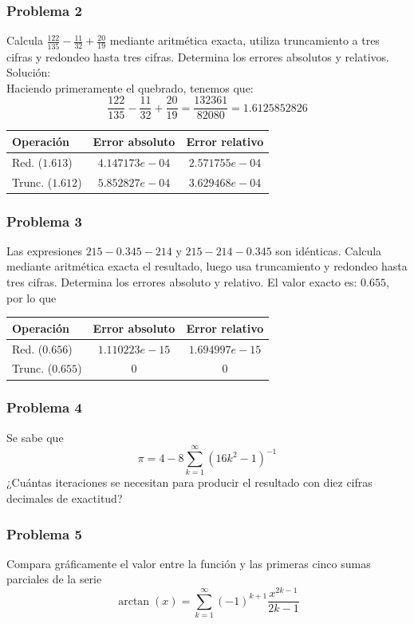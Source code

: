 \begin{frame}
\frametitle{Problema 2}
Calcula $\frac{122}{135} - \frac{11}{32} + \frac{20}{19}$ mediante aritmética exacta, utiliza truncamiento a tres cifras y redondeo hasta tres cifras. Determina los errores absolutos y relativos.
\pause
\\
\medskip
Solución:
\\
\medskip
Haciendo primeramente el quebrado, tenemos que:
\[ \dfrac{122}{135} - \dfrac{11}{32} + \dfrac{20}{19} = \dfrac{132361}{82080} = 1.6125852826 \]
\begin{tabular}{l | c | c}
\hline
Operación & Error absoluto & Error relativo \\ \hline
Red. ($1.613$) & $4.147173e-04$ & $2.571755e-04$ \\ \hline
Trunc. ($1.612$) & $5.852827e-04$ & $3.629468e-04$ \\ \hline
\end{tabular}
\end{frame}
\begin{frame}
\frametitle{Problema 3}
Las expresiones $215 -0.345-214$ y $215-214-0.345$ son idénticas. Calcula mediante aritmética exacta el resultado, luego usa truncamiento y redondeo hasta tres cifras. Determina los errores absoluto y relativo. 
\pause
El valor exacto es: $0.655$, por lo que
\begin{tabular}{l | c | c}
\hline
Operación & Error absoluto & Error relativo \\ \hline
Red. ($0.656$) & $1.110223e-15$ & $1.694997e-15$ \\ \hline
Trunc. ($0.655$) & $0$ & $0$ \\ \hline
\end{tabular}
\end{frame}
\begin{frame}
\frametitle{Problema 4}
Se sabe que
\[ \pi = 4 - 8 \sum_{k=1}^{\infty} \left( 16 k^{2} - 1 \right)^{-1} \]
¿Cuántas iteraciones se necesitan para producir el resultado con diez cifras decimales de exactitud?
\end{frame}
\begin{frame}[fragile]
\frametitle{Problema 5}
Compara gráficamente el valor entre la función y las primeras cinco sumas parciales de la serie
\[ \arctan(x) = \sum_{k=1}^{\infty} (-1)^{k+1} \dfrac{x^{2k-1}}{2k-1}\]
\end{frame}
